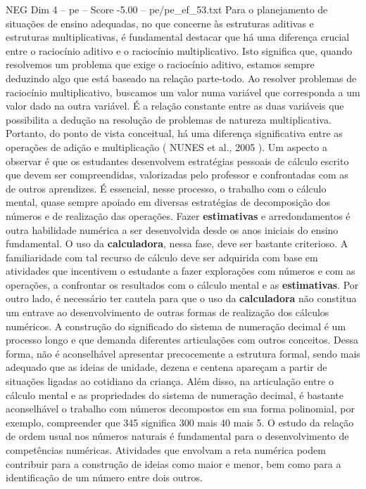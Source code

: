 \begin{textsample}{NEG Dim 4 – pe – Score -5.00 – pe/pe\_ef\_53.txt}
Para o planejamento de situações de ensino adequadas, no que concerne às estruturas aditivas e estruturas multiplicativas, é fundamental destacar que há uma diferença crucial entre o raciocínio aditivo e o raciocínio multiplicativo.
Isto significa que, quando resolvemos um problema que exige o raciocínio aditivo, estamos sempre deduzindo algo que está baseado na relação parte-todo.
Ao resolver problemas de raciocínio multiplicativo, buscamos um valor numa variável que corresponda a um valor dado na outra variável.
É a relação constante entre as duas variáveis que possibilita a dedução na resolução de problemas de natureza multiplicativa.
Portanto, do ponto de vista conceitual, há uma diferença significativa entre as operações de adição e multiplicação ( NUNES et al., 2005 ).
Um aspecto a observar é que os estudantes desenvolvem estratégias pessoais de cálculo escrito que devem ser compreendidas, valorizadas pelo professor e confrontadas com as de outros aprendizes.
É essencial, nesse processo, o trabalho com o cálculo mental, quase sempre apoiado em diversas estratégias de decomposição dos números e de realização das operações.
Fazer \textbf{estimativas} e arredondamentos é outra habilidade numérica a ser desenvolvida desde os anos iniciais do ensino fundamental.
O uso da \textbf{calculadora}, nessa fase, deve ser bastante criterioso.
A familiaridade com tal recurso de cálculo deve ser adquirida com base em atividades que incentivem o estudante a fazer explorações com números e com as operações, a confrontar os resultados com o cálculo mental e as \textbf{estimativas}.
Por outro lado, é necessário ter cautela para que o uso da \textbf{calculadora} não constitua um entrave ao desenvolvimento de outras formas de realização dos cálculos numéricos.
A construção do significado do sistema de numeração decimal é um processo longo e que demanda diferentes articulações com outros conceitos.
Dessa forma, não é aconselhável apresentar precocemente a estrutura formal, sendo mais adequado que as ideias de unidade, dezena e centena apareçam a partir de situações ligadas ao cotidiano da criança.
Além disso, na articulação entre o cálculo mental e as propriedades do sistema de numeração decimal, é bastante aconselhável o trabalho com números decompostos em sua forma polinomial, por exemplo, compreender que 345 significa 300 mais 40 mais 5.
O estudo da relação de ordem usual nos números naturais é fundamental para o desenvolvimento de competências numéricas.
Atividades que envolvam a reta numérica podem contribuir para a construção de ideias como maior e menor, bem como para a identificação de um número entre dois outros.

\end{textsample}
